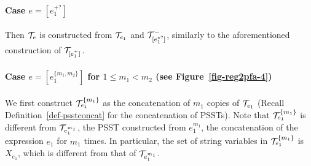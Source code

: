 \paragraph{Case $e = [e_1^{+?}]$} Then $\mathcal{T}_e$ is constructed from $\mathcal{T}_{e_1}$ and $\mathcal{T}^-_{[e^{\ast?}_1]}$, similarly to the aforementioned construction of $\mathcal{T}_{[e_1^{+}]}$.


\paragraph{Case $e = [e_1^{\{m_1,m_2\}}]$ for $1 \le m_1 < m_2$ (see Figure~\ref{fig-reg2pfa-4})} We first construct $\mathcal{T}^{\{m_1\}}_{e_1}$ as the concatenation of $m_1$ copies of $\mathcal{T}_{e_1}$ (Recall Definition~\ref{def-psstconcat} for the concatenation of PSSTs). Note that $\mathcal{T}^{\{m_1\}}_{e_1}$ is different from $\mathcal{T}_{e_1^{m_1}}$, the PSST constructed from $e_1^{m_1}$, the concatenation of the expression $e_1$ for $m_1$ times. In particular, the set of string variables in $\mathcal{T}^{\{m_1\}}_{e_1}$ is $X_{e_1}$, which is different from that of $\mathcal{T}_{e_1^{m_1}}$. 


